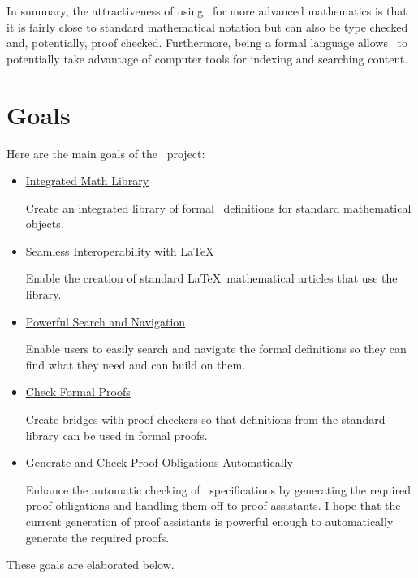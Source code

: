 \documentclass{amsart}
\begin{document}
In summary, the attractiveness of using \ZN\ for more advanced mathematics is that it is fairly close to standard mathematical notation but can also
be type checked and, potentially, proof checked.
Furthermore, being a formal language allows \ZN\ to potentially take advantage of computer tools for indexing and searching content.

\section{Goals}

Here are the main goals of the \mathz\ project:
\begin{itemize}

\item \hyperlink{integrated-math-library}{Integrated Math Library}

Create an integrated library of formal \ZN\ definitions for standard mathematical objects.

\item \hyperlink{seamless-interoperability-with-latex}{Seamless Interoperability with \LaTeX}

Enable the creation of standard \LaTeX\ mathematical articles that use the library.

\item \hyperlink{powerful-search-and-navigation}{Powerful Search and Navigation}

Enable users to easily search and navigate the formal definitions so they can find what they need and can build on them.

\item \hyperlink{check-formal-proof}{Check Formal Proofs}

Create bridges with proof checkers so that definitions from the standard library can be used in formal proofs.

\item \hyperlink{generate-and-check-proof-obligations-automatically}{Generate and Check Proof Obligations Automatically}

Enhance the automatic checking of \ZN\ specifications by generating the required proof obligations and handling them off to proof assistants.
I hope that the current generation of proof assistants is powerful enough to automatically generate the required proofs.

\end{itemize}

These goals are elaborated below.
\end{document}
